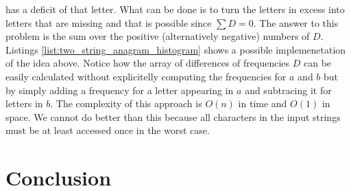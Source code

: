 has a deficit of that letter.
What can be done is to turn the letters in excess into letters that
are missing and that is possible since $\sum D = 0$.
The answer to this problem is the sum over the positive (alternatively negative) numbers of $D$. 
Listings \ref{list:two_string_anagram_histogram} shows a possible implemenetation of the idea above.
Notice how the array of differences of frequencies $D$ can be easily calculated without explicitelly
computing the frequencies for $a$ and $b$ but by simply adding a frequency for a letter appearing in $a$
and subtracing it for letters in $b$. 
The complexity of this approach is $O(n)$ in time and $O(1)$ in space. We cannot do better than this because all characters in the input strings must be at least accessed once in the worst case.


	


\section{Conclusion}